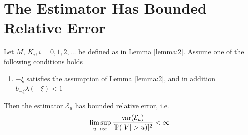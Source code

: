 \documentclass[aoas,preprint]{imsart}
\numberwithin{equation}{section}
\theoremstyle{plain}
\begin{document}
\section{The Estimator Has Bounded Relative Error}\label{sec:efficiency}
\begin{theorem}
  Let $M$, $K_i, i=0, 1, 2, \dots$ be defined as in Lemma
  \ref{lemma:2}. Assume one of the following conditions holds
  \begin{enumerate}[1)]
    \item $-\xi$ satisfies the assumption of Lemma \ref{lemma:2}, and in
      addition $b_{-\xi} \lambda(-\xi) < 1$
  \end{enumerate}
  Then the estimator $\mathcal E_u$ has bounded relative error, i.e.
  \begin{equation*}
    \limsup_{u \to \infty} {\text{var}(\mathcal E_u) \over [\mathbb{P}(|V| > u)]^2} < \infty
  \end{equation*}
\end{theorem}
\end{document}
